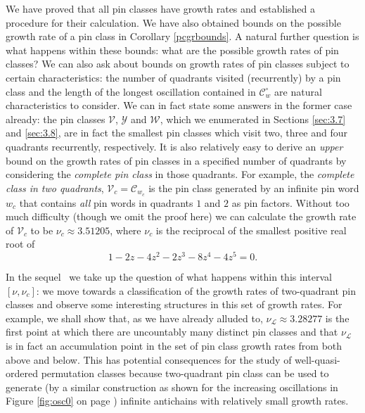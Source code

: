 \documentclass[11pt,a4paper]{article}
\theoremstyle{definition}
\begin{document}
We have proved that all pin classes have growth rates and established a procedure for their calculation. We have also obtained bounds on the possible growth rate of a pin class in Corollary \ref{pcgrbounds}. A natural further question is what happens within these bounds: what are the possible growth rates of pin classes? We can also ask about bounds on growth rates of pin classes subject to certain characteristics: the number of quadrants visited (recurrently) by a pin class and the length of the longest oscillation contained in $\mathcal{C}^{\circ}_{w}$ are natural characteristics to consider. We can in fact state some answers in the former case already: the pin classes $\mathcal{V}$, $\mathcal{Y}$ and $\mathcal{W}$, which we enumerated in Sections \ref{sec:3.7} and \ref{sec:3.8}, are in fact the smallest pin classes which visit two, three and four quadrants recurrently, respectively. It is also relatively easy to derive an \emph{upper} bound on the growth rates of pin classes in a specified number of quadrants by considering the \emph{complete pin class} in those quadrants. For example, the \emph{complete class in two quadrants}, $\mathcal{V}_{c} = \mathcal{C}_{w_{c}}$ is the pin class generated by an infinite pin word $w_{c}$ that contains \emph{all} pin words in quadrants $1$ and $2$ as pin factors. Without too much difficulty (though we omit the proof here) we can calculate the growth rate of $\mathcal{V}_{c}$ to be $\nu_{c} \approx 3.51205$, where $\nu_{c}$ is the reciprocal of the smallest positive real root of
\[
1 - 2z - 4z^2 - 2z^3 - 8z^4 - 4z^5 = 0.
\]

In the sequel~\cite{brignall2024pinclassesiismall} we take up the question of what happens within this interval $[\nu,\nu_{c}]$: we move towards a classification of the growth rates of two-quadrant pin classes and observe some interesting structures in this set of growth rates. For example, we shall show that, as we have already alluded to, $\nu_{\mathcal{L}} \approx 3.28277$ is the first point at which there are uncountably many distinct pin classes and that $\nu_{\mathcal{L}}$ is in fact an accumulation point in the set of pin class growth rates from both above and below. This has potential consequences for the study of well-quasi-ordered permutation classes because two-quadrant pin class can be used to generate (by a similar construction as shown for the increasing oscillations in Figure \ref{fig:osc0} on page \pageref{fig:osc0}) infinite antichains with relatively small growth rates.
\end{document}

